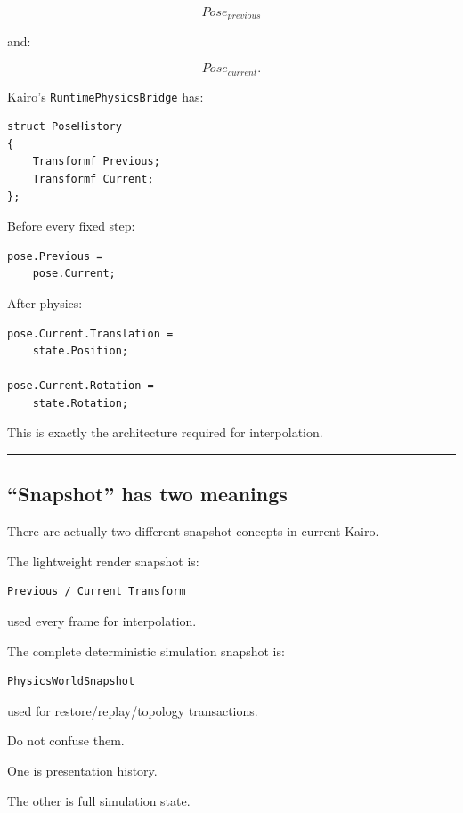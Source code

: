 \[
Pose_{previous}
\]

and:

\[
Pose_{current}.
\]

Kairo's \texttt{RuntimePhysicsBridge} has:

\begin{verbatim}
struct PoseHistory
{
    Transformf Previous;
    Transformf Current;
};
\end{verbatim}

Before every fixed step:

\begin{verbatim}
pose.Previous =
    pose.Current;
\end{verbatim}

After physics:

\begin{verbatim}
pose.Current.Translation =
    state.Position;

pose.Current.Rotation =
    state.Rotation;
\end{verbatim}

This is exactly the architecture required for interpolation.

\begin{center}\rule{0.5\linewidth}{0.5pt}\end{center}

\subsection{``Snapshot'' has two meanings}\label{06-engine-ii-ch037-snapshot-has-two-meanings}

There are actually two different snapshot concepts in current Kairo.

The lightweight render snapshot is:

\begin{verbatim}
Previous / Current Transform
\end{verbatim}

used every frame for interpolation.

The complete deterministic simulation snapshot is:

\begin{verbatim}
PhysicsWorldSnapshot
\end{verbatim}

used for restore/replay/topology transactions.

Do not confuse them.

One is presentation history.

The other is full simulation state.

